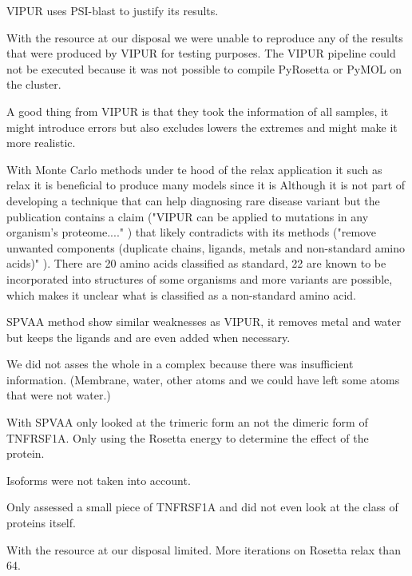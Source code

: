 VIPUR uses PSI-blast to justify its results. 

With the resource at our disposal we were unable to reproduce any of the results that were produced by VIPUR for testing purposes.
The VIPUR pipeline could not be executed because it was not possible to compile PyRosetta or PyMOL on the cluster.

A good thing from VIPUR is that they took the information of all samples, it might introduce errors but also excludes lowers the extremes and might make it more realistic.



With Monte Carlo methods under te hood of the relax application it  such as relax it is beneficial to produce many models since it is
Although it is not part of developing a technique that can help diagnosing rare disease variant but the publication contains a claim ("VIPUR can be applied to mutations in any organism’s proteome...." \cite{}) that likely contradicts with its methods ("remove unwanted components (duplicate chains, ligands, metals and non-standard amino acids)" \cite{}). There are 20 amino acids classified as standard, 22 are known to be incorporated into structures of some organisms \cite{} and more variants are possible, which makes it unclear what is classified as a non-standard amino acid.




SPVAA method show similar weaknesses as VIPUR, it removes metal and water but keeps the ligands and are even added when necessary.

We did not asses the whole in a complex because there was insufficient information. (Membrane, water, other atoms and we could have left some atoms that were not water.)

With SPVAA only looked at the trimeric form an not the dimeric form of TNFRSF1A.
Only using the Rosetta energy to determine the effect of the protein.

Isoforms were not taken into account.

Only assessed a small piece of TNFRSF1A and did not even look at the class of proteins itself.

With the resource at our disposal  limited.
More iterations on Rosetta relax than 64\cite{}.

